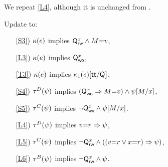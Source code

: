 We repeat \ref{L4}, although it is unchanged from .
\begin{definition}[$\xCO$]
  \label{def:pomsets-co}
  Update  to:
  \begin{enumerate}
  \item[\ref{S3})]
    $\kappa(e)$ implies $\mathsf{Q}_{\mathsf{rw}}^{x}\land M{=}v$,
  \item[\ref{L3})]
    $\kappa(e)$ implies $\mathsf{Q}_{\mathsf{wo}}^{x}$,
  \item[\ref{T3})]
    $\kappa(e)$ implies $\kappa_1(e)[\mathsf{tt}/\mathsf{Q}_{}]$,
  \end{enumerate}
  \begin{enumerate}
  \item[\ref{S4})]
    $\aTr{\bEvs}{\bForm}$ implies $(\mathsf{Q}_{\mathsf{wo}}^{x}\Rightarrow M{=}v)\land\psi[M/x]$,
  \item[\ref{S5})]
    $\aTr{\cEvs}{\bForm}$ implies $\lnot\mathsf{Q}_{\mathsf{wo}}^{x}\land \psi[M/x]$.
  \item[\ref{L4})]
    $\aTr{\bEvs}{\bForm}$ implies $v{=}r\Rightarrow\psi$, 
  \item[\ref{L5})]
    $\aTr{\cEvs}{\bForm}$ implies $\lnot\mathsf{Q}_{\mathsf{rw}}^{x} \land((v{=}r\lor x{=}r)\Rightarrow\psi)$,
  \item[\ref{L6})]
    $\aTr{\dEvs}{\bForm}$ implies $\lnot\mathsf{Q}_{\mathsf{rw}}^{x} \land\psi$.
  \end{enumerate}
\end{definition}



